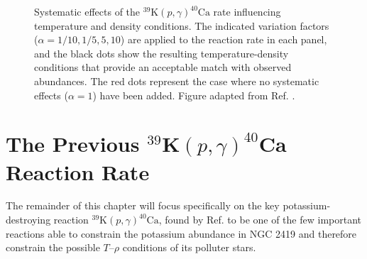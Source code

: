 \begin{figure}[t]
\centering
\noindent
{}
\caption{\label{fig:39K_p_g_Sens}Systematic effects of the $^{39}\mathrm{K}(p,\gamma)^{40}\mathrm{Ca}$ rate influencing temperature and density conditions. The indicated variation factors ($\alpha = 1/10, 1/5, 5, 10$) are applied to the reaction rate in each panel, and the black dots show the resulting temperature-density conditions that provide an acceptable match with observed abundances. The red dots represent the case where no systematic effects ($\alpha=1$) have been added. Figure adapted from Ref. \cite{Dermigny2017}.}
\end{figure}

\section{The Previous $^{39}\mathrm{\textbf{K}}(p,\gamma)^{40}\mathrm{\textbf{Ca}}$ Reaction Rate} \label{sec:prev_39K_p_g_rate}

The remainder of this chapter will focus specifically on the key potassium-destroying reaction $^{39}\mathrm{K}(p,\gamma)^{40}\mathrm{Ca}$, found by Ref. \cite{Dermigny2017} to be one of the few important reactions able to constrain the potassium abundance in NGC 2419 and therefore constrain the possible $T$--$\rho$ conditions of its polluter stars. 


